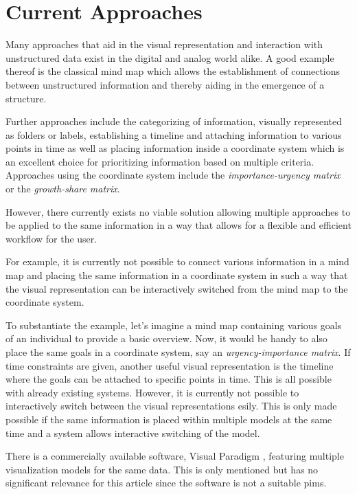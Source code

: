 \section{Current Approaches}

Many approaches that aid in the visual representation and interaction with
unstructured data exist in the digital and analog world alike. A good example
thereof is the classical mind map which allows the establishment of connections
between unstructured information and thereby aiding in the emergence of a
structure.

Further approaches include the categorizing of information, visually
represented as folders or labels, establishing a timeline and attaching
information to various points in time as well as placing information inside a
coordinate system which is an excellent choice for prioritizing information
based on multiple criteria. Approaches using the coordinate system include
the \textit{importance-urgency matrix} or the \textit{growth-share matrix}.

However, there currently exists no viable solution allowing multiple approaches
to be applied to the same information in a way that allows for a flexible and
efficient workflow for the user.

For example, it is currently not possible to connect various information in a
mind map and placing the same information in a coordinate system in such a way
that the visual representation can be interactively switched from the mind map
to the coordinate system.

To substantiate the example, let's imagine a mind map containing various goals
of an individual to provide a basic overview. Now, it would be handy to also
place the same goals in a coordinate system, say an \textit{urgency-importance
matrix}. If time constraints are given, another useful visual representation is
the timeline where the goals can be attached to specific points in time. This
is all possible with already existing systems. However, it is currently not
possible to interactively switch between the visual representations esily. This
is only made possible if the same information is placed within multiple models
at the same time and a system allows interactive switching of the model.

There is a commercially available software, Visual Paradigm
\cite{visualparadigm}, featuring multiple visualization models for the same
data. This is only mentioned but has no significant relevance for this article
since the software is not a suitable \gls{pims}.
